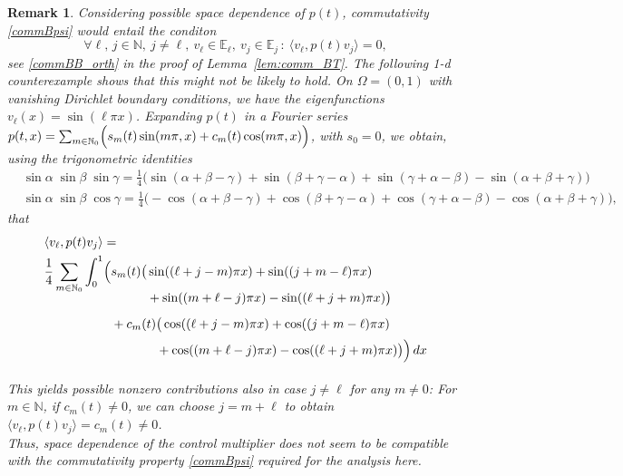 \documentclass[12pt]{article}
\newtheorem{remark}[theorem]{Remark}
\newcommand\contr{p}
\begin{document}
\begin{remark}\label{rem:comm_diff}
Considering possible space dependence of $\contr(t)$, commutativity \eqref{commBpsi} would 
entail the conditon 
\begin{equation*}%
\forall \ell,\,j\in \mathbb{N}, \ j\not=\ell, \ v_\ell\in \mathbb{E}_\ell,\ v_j\in \mathbb{E}_j \,:\
\langle v_\ell,\contr(t) v_j \rangle=0,
\end{equation*}
see \eqref{commBB_orth} in the proof of Lemma~\ref{lem:comm_BT}.
The following 1-d counterexample shows that this might not be likely to hold. 
On $\Omega=(0,1)$ with vanishing Dirichlet boundary conditions, we have the eigenfunctions $v_\ell(x)=\sin(\ell\pi x)$. Expanding $\contr(t)$ in a Fourier series 
$\contr(t,x)=\sum_{m\in\mathbb{N}_0} \Bigl(s_m(t)\sin(m\pi,x)+c_m(t)\cos(m\pi,x)\Bigr)$, with $s_0=0$, we obtain, using the trigonometric identities
{\small
\[
\begin{aligned}
&\sin \alpha\;\sin \beta\;\sin \gamma=\tfrac{1}{4}\Big(\sin(\alpha+\beta-\gamma)+\sin(\beta+\gamma-\alpha)+\sin(\gamma+\alpha-\beta)-\sin(\alpha+\beta+\gamma)\Big)
\\[0ex]
&\sin \alpha\;\sin \beta\;\cos \gamma=\tfrac{1}{4}\Big(-\cos(\alpha+\beta-\gamma)+\cos(\beta+\gamma-\alpha)+\cos(\gamma+\alpha-\beta)-\cos(\alpha+\beta+\gamma)\Big),
\end{aligned}
\]
}
that 
\[
\begin{aligned}
&\langle v_\ell,\contr(t) v_j \rangle=\\
&\frac14 \sum_{m\in\mathbb{N}_0} \int_0^1\Bigl(
s_m(t)\big(\sin((\ell+j-m)\pi x)+\sin((j+m-\ell)\pi x)\\[-3ex]
&\phantom{\frac14 \sum_{m\in\mathbb{N}_0} \int_0^1\Bigl(s_m(t)\big(}
		  +\sin((m+\ell-j)\pi x)-\sin((\ell+j+m)\pi x)\big)\\[-3ex]
&\phantom{\frac14 \sum_{m\in\mathbb{N}_0} \int_0^1\Bigl(}
+c_m(t)\big(\cos((\ell+j-m)\pi x)+\cos((j+m-\ell)\pi x)\\[-3ex]
&\phantom{\frac14 \sum_{m\in\mathbb{N}_0} \int_0^1\Bigl(+c_m(t)\big(}
		  +\cos((m+\ell-j)\pi x)-\cos((\ell+j+m)\pi x)\big)
\Big)\, dx
\end{aligned}
\]
This yields possible nonzero contributions also in case $j\not=\ell$ for any $m\not=0$:
For $m\in\mathbb{N}$, if $c_m(t)\not=0$, we can choose $j=m+\ell$ to obtain 
$\langle v_\ell,\contr(t) v_j \rangle=c_m(t)\not=0$.
\\
Thus, space dependence of the control multiplier does not seem to be compatible with the commutativity property \eqref{commBpsi} required for the analysis here.
\end{remark}
\end{document}
